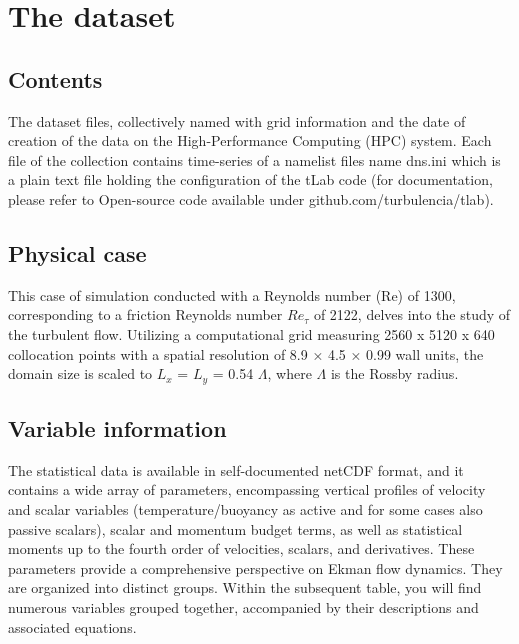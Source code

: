 \documentclass[11pt]{article}
\begin{document}
\section{The dataset}

\subsection{Contents}

The dataset files, collectively named with grid information and the date of creation of the data on the High-Performance Computing (HPC) system. Each file of the collection contains time-series of a namelist files name dns.ini which is a plain text file holding the configuration of the tLab code (for documentation, please refer to Open-source code available under github.com/turbulencia/tlab). \\

\subsection{Physical case}

This case of simulation conducted with a Reynolds number (Re) of 1300, corresponding to a friction Reynolds number \(Re_{\tau}\) of 2122, delves into the study of the turbulent flow. Utilizing a computational grid measuring 2560 x 5120 x 640 collocation points with a spatial resolution of 8.9 × 4.5 × 0.99 wall units, the domain size is scaled to \(L_x\) = \(L_y\) = 0.54 \(\Lambda\), where \(\Lambda\) is the Rossby radius.\\

\subsection{Variable information}

The statistical data is available in self-documented netCDF format, and it contains a wide array of parameters, encompassing vertical profiles of velocity and scalar variables (temperature/buoyancy as active and for some cases also passive scalars), scalar and momentum budget terms, as well as statistical moments up to the fourth order of velocities, scalars, and derivatives. These parameters provide a comprehensive perspective on Ekman flow dynamics. They are organized into distinct groups. Within the subsequent table, you will find numerous variables grouped together, accompanied by their descriptions and associated equations.
\end{document}
